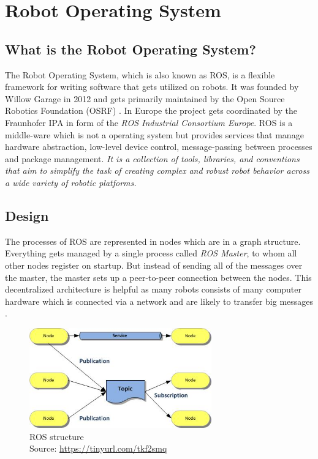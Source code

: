 
\chapter{Robot Operating System\authorA}

\section{What is the Robot Operating System?}
The Robot Operating System, which is also known as ROS, is a flexible framework for writing software that gets utilized on robots. It was founded by Willow Garage in 2012 and gets primarily maintained by the Open Source Robotics Foundation (OSRF) \cite{osrf}. In Europe the project gets coordinated by the Fraunhofer IPA in form of the \textit{ROS Industrial Consortium Europe}. ROS is a middle-ware which is not a operating system but provides services that manage hardware abstraction, low-level device control, message-passing between processes and package management. \emph{\glqq It is a collection of tools, libraries, and conventions that aim to simplify the task of creating complex and robust robot behavior across a wide variety of robotic platforms.\grqq}~\cite{aboutros}

\section{Design}
The processes of ROS are represented in nodes which are in a graph structure. Everything gets managed by a single process called \textit{ROS Master}, to whom all other nodes register on startup. But instead of sending all of the messages over the master, the master sets up a peer-to-peer connection between the nodes. This decentralized architecture is helpful as many robots consists of many computer hardware which is connected via a network and are likely to transfer big messages \cite{rosoneoone}. \newline
\begin{figure}[h]
	\centering
	\includegraphics[width=0.7\textwidth]{./media/images/ros_structure.jpg}
  	\caption{ROS structure
  	\\Source: \url{https://tinyurl.com/tkf2smq}}
  	\label{rosstructure}
\end{figure}

